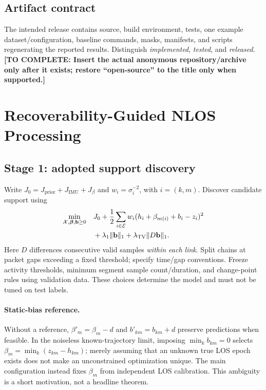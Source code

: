 \documentclass[conference]{IEEEtran}
\newcommand{\X}{\mathcal X}
\newcommand{\E}{\mathcal E}
\newcommand{\todo}[1]{\textcolor{red!70!black}{\textbf{[TO COMPLETE: #1]}}}
\begin{document}
\subsection{Artifact contract}
The intended release contains source, build environment, tests, one example dataset/configuration, baseline commands, masks, manifests, and scripts regenerating the reported results. Distinguish \emph{implemented}, \emph{tested}, and \emph{released}. \todo{Insert the actual anonymous repository/archive only after it exists; restore ``open-source'' to the title only when supported.}

\section{Recoverability-Guided NLOS Processing}
\label{sec:method}
\subsection{Stage 1: adopted support discovery}
Write $J_0=J_{\mathrm{prior}}+J_{\mathrm{IMU}}+J_\beta$ and $w_i=\sigma_i^{-2}$, with $i=(k,m)$. Discover candidate support using
\begin{equation}
 \begin{aligned}
 \min_{\X,\bm\beta,\mathbf b\geq0}\quad
 &J_0+\frac12\sum_{i\in\E}w_i(h_i+\beta_{m(i)}+b_i-z_i)^2\\
 &+\lambda_1\|\mathbf b\|_1+\lambda_{\rm TV}\|D\mathbf b\|_1.
 \end{aligned}
 \label{eq:discovery}
\end{equation}
Here $D$ differences consecutive valid samples \emph{within each link}. Split chains at packet gaps exceeding a fixed threshold; specify time/gap conventions. Freeze activity thresholds, minimum segment sample count/duration, and change-point rules using validation data. These choices determine the model and must not be tuned on test labels.

\paragraph{Static-bias reference.}
Without a reference, $\beta'_m=\beta_m-d$ and $b'_{km}=b_{km}+d$ preserve predictions when feasible. In the noiseless known-trajectory limit, imposing $\min_k b_{km}=0$ selects $\beta_m=\min_k(z_{km}-h_{km})$; merely assuming that an unknown true LOS epoch exists does not make an unconstrained optimization unique. The main configuration instead fixes $\beta_m$ from independent LOS calibration. This ambiguity is a short motivation, not a headline theorem.
\end{document}
